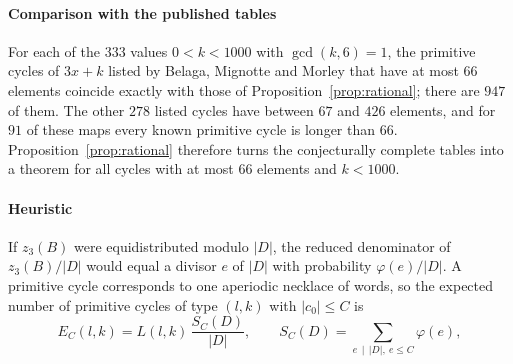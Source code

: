 \documentclass[12pt]{amsart}
\theoremstyle{definition}
\theoremstyle{remark}
\begin{document}
\paragraph{Comparison with the published tables} For each of the $333$ values $0<k<1000$ with $\gcd(k,6)=1$, the primitive cycles of $3x+k$ listed by Belaga, Mignotte and Morley \cite{Belaga_Mignotte_2006,OEIS_A226607} that have at most $66$ elements coincide exactly with those of Proposition~\ref{prop:rational}; there are $947$ of them. The other $278$ listed cycles have between $67$ and $426$ elements, and for $91$ of these maps every known primitive cycle is longer than $66$. Proposition~\ref{prop:rational} therefore turns the conjecturally complete tables into a theorem for all cycles with at most $66$ elements and $k<1000$.

\paragraph{Heuristic} If $z_3(B)$ were equidistributed modulo $|D|$, the reduced denominator of $z_3(B)/|D|$ would equal a divisor $e$ of $|D|$ with probability $\varphi(e)/|D|$. A primitive cycle corresponds to one aperiodic necklace of words, so the expected number of primitive cycles of type $(l,k)$ with $|c_0|\le C$ is
\[
E_C(l,k)=L(l,k)\,\frac{S_C(D)}{|D|},\qquad S_C(D)=\sum_{e\,\mid\,|D|,\ e\le C}\varphi(e),
\]
\end{document}

